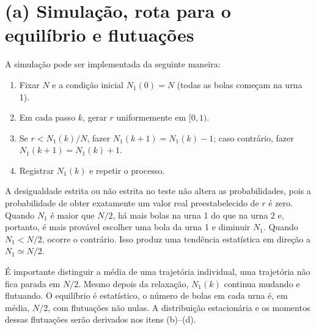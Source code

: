 \documentclass[12pt,a4paper]{article}
\begin{document}
\section*{(a) Simulação, rota para o equilíbrio e flutuações}
%
A simulação pode ser implementada da seguinte maneira:
%
\begin{enumerate}
  \item Fixar $N$ e a condição inicial $N_1(0)=N$ (todas as bolas começam na urna 1).
  \item Em cada passo $k$, gerar $r$ uniformemente em $[0,1)$.
  \item Se $r<N_1(k)/N$, fazer $N_1(k+1)=N_1(k)-1$; caso contrário, fazer $N_1(k+1)=N_1(k)+1$.
  \item Registrar $N_1(k)$ e repetir o processo.
\end{enumerate}
%
A desigualdade estrita ou não estrita no teste não altera as probabilidades, pois a probabilidade de obter exatamente um valor real preestabelecido de $r$ é zero. Quando $N_1$ é maior que $N/2$, há mais bolas na urna 1 do que na urna 2 e, portanto, é mais provável escolher uma bola da urna 1 e diminuir $N_1$. Quando $N_1<N/2$, ocorre o contrário. Isso produz uma tendência estatística em direção a $N_1\simeq N/2$.

É importante distinguir a média de uma trajetória individual, uma trajetória não fica parada em $N/2$. Mesmo depois da relaxação, $N_1(k)$ continua mudando e flutuando. O equilíbrio é estatístico, o número de bolas em cada urna é, em média, $N/2$, com flutuações não nulas. A distribuição estacionária e os momentos dessas flutuações serão derivados nos itens (b)--(d).
\end{document}
